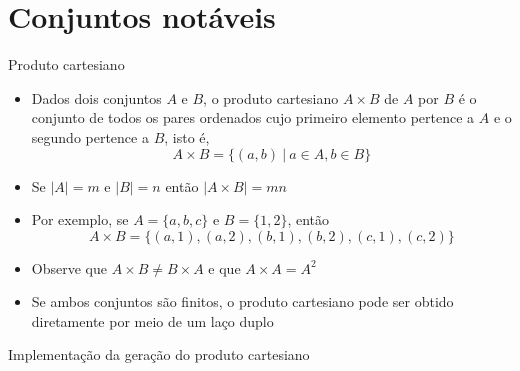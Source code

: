 \section{Conjuntos notáveis}

\begin{frame}[fragile]{Produto cartesiano}

    \begin{itemize}
        \item Dados dois conjuntos $A$ e $B$, o produto cartesiano $A\times B$ de $A$ por
            $B$ é o conjunto de todos os pares ordenados cujo primeiro elemento pertence
            a $A$ e o segundo pertence a $B$, isto é,
        \[
            A\times B = \lbrace (a, b)\ |\ a\in A, b\in B\rbrace
        \]

        \item Se $|A| = m$ e $|B| = n$ então $|A\times B| = mn$

        \item Por exemplo, se $A = \lbrace a, b, c\rbrace$ e $B = \lbrace 1, 2\rbrace$, então
        \[
            A\times B = \lbrace (a, 1), (a, 2), (b, 1), (b, 2), (c, 1), (c, 2)\rbrace
        \]

        \item Observe que $A\times B \neq B\times A$ e que $A\times A = A^2$

        \item Se ambos conjuntos são finitos, o produto cartesiano pode ser obtido diretamente
            por meio de um laço duplo
    \end{itemize}

\end{frame}

\begin{frame}[fragile]{Implementação da geração do produto cartesiano}
\end{frame}

